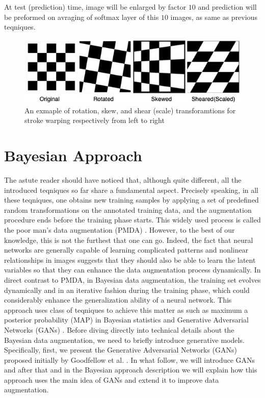 At test (prediction) time, image will be enlarged by factor $10$ and prediction will be preformed on
avraging of softmax layer of this $10$ images, as same as previous teqniques.

\begin{figure}
  \centering
  \label{fig:stroke_warping_transforamtions}
  \includegraphics[width=1\textwidth]{fig/stroke_warping_transforamtions}
  \caption{An exmaple of rotation, skew, and shear (scale) transforamtions for stroke warping respectively from left to right \cite{stroke_warping_github_picture}}
\end{figure}


\section{Bayesian Approach}
\label{tit:bayesian-approach}
The astute reader should have noticed that, although quite different, all the introduced teqniques so far share a fundamental aspect. Precisely speaking, in all these teqniques, one obtains new training samples by applying a set of predefined random transformations on the annotated training data, and the augmentation procedure ends before the training phase starts. This widely used process is called the poor man's data augmentation (PMDA) \cite{poor_man_data_augmentation}. However, to the best of our knowledge, this is not the furthest that one can go. Indeed, the fact that neural networks are generally capable of learning complicated patterns and nonlinear relationships in images suggests that they should also be able to learn the latent variables so that they can enhance the data augmentation process dynamically.
In direct contrast to PMDA, in Bayesian data augmentation, the training set evolves dynamically and
in an iterative fashion during the training phase, which could considerably enhance the
generalization ability of a neural network. This approach uses class of teqniques to achieve this
matter as such as maximum a posterior probability (MAP) \cite{MAP_Bayesian} in Bayesian statistics and Generative
Adversarial Networks (GANs) . Before diving directly into technical details about the
Bayesian data augmentation, we need to briefly introduce generative models. Specifically, first, we
present the Generative Adversarial Networks (GANs) proposed initially by Goodfellow et al.
\cite{goodflew_bayesian_approach}. In what follow, we
will introduce GANs and after that and in the Bayesian approach description we will explain how this
approach uses the main idea of GANs and extend it to improve data augmentation.


